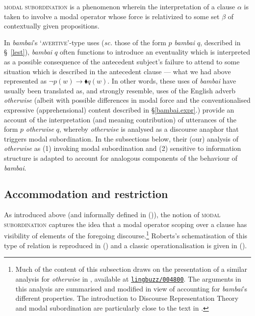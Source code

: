 \pex\label{modsub-def}\textsc{modal subordination} is a phenomenon wherein the interpretation of a clause $ \alpha $ is taken to involve a modal operator whose force is relativized to some set $ \beta $ of contextually given propositions.\hfill\citep[718]{Roberts1989}


\xe







In \textit{bambai}'s `\textsc{avertive'}-type uses (\textit{sc.} those of the form \textit{$ p $ bambai $ q $}, described in \S~\ref{lest}), \textit{bambai $ q $} often functions to introduce an eventuality which is interpreted as a possible consequence of the antecedent subject's failure to attend to some situation which is described in the antecedent clause --- what we had above represented as $ \neg p(w)\to\blacklozenge q(w)$. In other words, these uses of \textit{bambai} have usually been translated as, and strongly resemble, uses of the English adverb \textit{otherwise} (albeit with possible differences in modal force and the conventionalised expressive (apprehensional) content described in \S \ref{bambai.expr}.) \citet{PhilKotek} provide an account of the interpretation (and meaning contribution) of utterances of the form $ p  $ \textit{otherwise} $ q $, whereby \textit{otherwise} is analysed as a discourse anaphor that triggers modal subordination. In the subsections below, their (our) analysis of \textit{otherwise} as (1) invoking modal subordination and (2) sensitive to information structure is adapted to account for analogous components of the behaviour of \textit{bambai}.


\subsection{Accommodation and restriction}\label{modsub}

As introduced above (and informally defined in (\lastx)), the notion of \textsc{modal subordination} captures the idea that a modal operator scoping over a clause has visibility of elements of the foregoing discourse.\footnote{Much of the content of this subsection draws on the presentation of a similar analysis for \textit{otherwise} in \citet{PhilKotek2018,PhilKotek}, available at \href{https://ling.auf.net/lingbuzz/004800}{\texttt{lingbuzz/004800}}. The arguments in this analysis are summarised and modified in view of accounting for \textit{bambai}'s different properties. The introduction to Discourse Representation Theory and modal subordination are particularly close to the text in \citeyear[§4]{PhilKotek}.} Roberts's schematisation of this type of relation is reproduced in () and a classic operationalisation is given in ().

